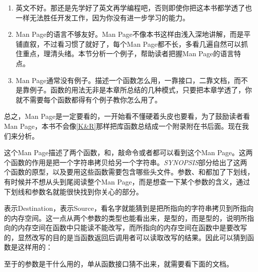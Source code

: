\begin{enumerate}

\item 英文不好。那还是先学好了英文再学编程吧，否则即使你把这本书都学透了也一样无法胜任开发工作，因为你没有进一步学习的能力。

\item Man Page的语言不够友好。Man Page不像本书这样由浅入深地讲解，而是平铺直叙，不过看习惯了就好了，每个Man Page都不长，多看几遍自然可以抓住重点，理清头绪。本节分析一个例子，帮助读者把握Man Page的语言特点。

\item Man Page通常没有例子。描述一个函数怎么用，一靠接口，二靠文档，而不是靠例子。函数的用法无非是本章所总结的几种模式，只要把本章学透了，你就不需要每个函数都得有个例子教你怎么用了。
\end{enumerate}


总之，Man Page是一定要看的，一开始看不懂硬着头皮也要看，为了鼓励读者看Man Page，本书不会像\hyperlink{db.bi01.bibli.kr}{[K\&R]}那样把库函数总结成一个附录附在书后面。现在我们来分析。




这个Man Page描述了两个函数，和，敲命令或者都可以看到这个Man Page。这两个函数的作用是把一个字符串拷贝给另一个字符串。\emph{SYNOPSIS}部分给出了这两个函数的原型，以及要用这些函数需要包含哪些头文件。参数、和都加了下划线，有时候并不想从头到尾阅读整个Man Page，而是想查一下某个参数的含义，通过下划线和参数名就能很快找到你关心的部分。



表示Destination，表示Source，看名字就能猜到是把所指向的字符串拷贝到所指向的内存空间。这一点从两个参数的类型也能看出来，是型的，而是型的，说明所指向的内存空间在函数中只能读不能改写，而所指向的内存空间在函数中是要改写的，显然改写的目的是当函数返回后调用者可以读取改写的结果。因此可以猜到函数是这样用的：




至于的参数是干什么用的，单从函数接口猜不出来，就需要看下面的文档。


